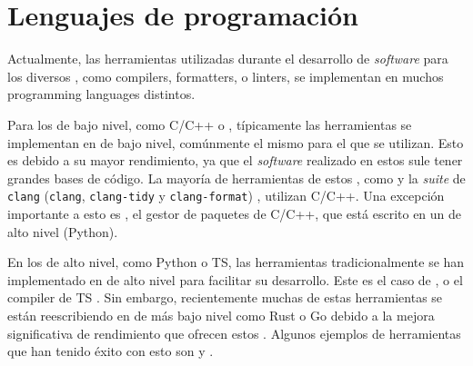 \FloatBarrier

\section{Lenguajes de programación}\label{sec:programming-languages}

Actualmente, las herramientas utilizadas durante el desarrollo de
\textit{software} para los diversos ,
como \glspl{compiler}, \glspl{formatter}, o \glspl{linter}, se implementan en
muchos \glspl{programming language} distintos.

Para los  de bajo nivel, como C/C++ o
, típicamente las herramientas se implementan en
 de bajo nivel, comúnmente el mismo
para el que se utilizan. Esto es debido a su mayor rendimiento, ya que el
\textit{software} realizado en estos 
sule tener grandes bases de código. La mayoría de herramientas de estos
, como  y la
\textit{suite} de \verb!clang! (\verb!clang!, \verb!clang-tidy! y
\verb!clang-format!) \parencite{clang}, utilizan C/C++. Una excepción importante
a esto es , el gestor de paquetes de C/C++, que está escrito en
un  de alto nivel (Python).

En los  de alto nivel, como Python o
\gls{TS}, las herramientas tradicionalmente se han implementado en
 de alto nivel para facilitar su
desarrollo. Este es el caso de ,  o el
\gls{compiler} de \gls{TS} \parencite{tsc}. Sin embargo, recientemente muchas de
estas herramientas se están reescribiendo en  de más bajo nivel como Rust o Go debido a la mejora
significativa de rendimiento que ofrecen estos  \parencite{typescript-go}. Algunos ejemplos de herramientas
que han tenido éxito con esto son  y .
